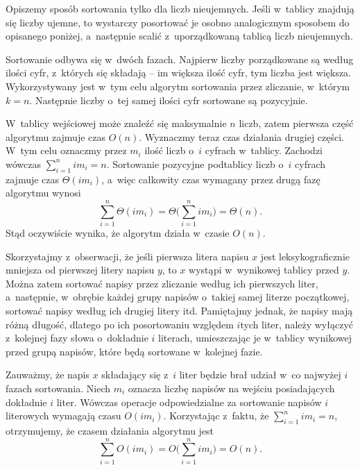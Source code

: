 
\subproblem %
Opiszemy sposób sortowania tylko dla liczb nieujemnych.
Jeśli w~tablicy znajdują się liczby ujemne, to wystarczy posortować je osobno analogicznym sposobem do opisanego poniżej, a~następnie scalić z~uporządkowaną tablicą liczb nieujemnych.

Sortowanie odbywa się w~dwóch fazach.
Najpierw liczby porządkowane są według ilości cyfr, z~których się składają -- im większa ilość cyfr, tym liczba jest większa.
Wykorzystywany jest w~tym celu algorytm sortowania przez zliczanie, w~którym $k=n$.
Następnie liczby o~tej samej ilości cyfr sortowane są pozycyjnie.

W~tablicy wejściowej może znaleźć się maksymalnie $n$ liczb, zatem pierwsza część algorytmu zajmuje czas $O(n)$.
Wyznaczmy teraz czas działania drugiej części.
W~tym celu oznaczmy przez $m_i$ ilość liczb o~$i$ cyfrach w~tablicy.
Zachodzi wówczas $\sum_{i=1}^nim_i=n$.
Sortowanie pozycyjne podtablicy liczb o~$i$ cyfrach zajmuje czas $\Theta(im_i)$, a~więc całkowity czas wymagany przez drugą fazę algorytmu wynosi
\[
    \sum_{i=1}^n\Theta(im_i) = \Theta\biggl(\sum_{i=1}^nim_i\biggr) = \Theta(n).
\]
Stąd oczywiście wynika, że algorytm działa w~czasie $O(n)$.

\subproblem %
Skorzystajmy z~obserwacji, że jeśli pierwsza litera napisu $x$ jest leksykograficznie mniejsza od pierwszej litery napisu $y$, to $x$ wystąpi w~wynikowej tablicy przed $y$.
Można zatem sortować napisy przez zliczanie według ich pierwszych liter, a~następnie, w~obrębie każdej grupy napisów o~takiej samej literze początkowej, sortować napisy według ich drugiej litery itd.
Pamiętajmy jednak, że napisy mają różną długość, dlatego po ich posortowaniu względem $i$\nbhyphen tych liter, należy wyłączyć z~kolejnej fazy słowa o~dokładnie $i$ literach, umieszczając je w~tablicy wynikowej przed grupą napisów, które będą sortowane w~kolejnej fazie.

Zauważmy, że napis $x$ składający się z~$i$ liter będzie brał udział w~co najwyżej $i$ fazach sortowania.
Niech $m_i$ oznacza liczbę napisów na wejściu posiadających dokładnie $i$ liter.
Wówczas operacje odpowiedzialne za sortowanie napisów $i$\nbhyphen literowych wymagają czasu $O(im_i)$.
Korzystając z~faktu, że $\sum_{i=1}^nim_i=n$, otrzymujemy, że czasem działania algorytmu jest
\[
    \sum_{i=1}^nO(im_i) = O\biggl(\sum_{i=1}^nim_i\biggr) = O(n).
\]
